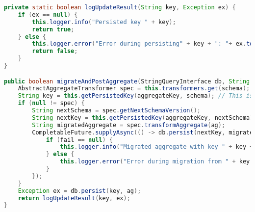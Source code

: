 \begin{lstlisting}[language=Java, caption={Metode for håndtering av POST-spørring i Migrator.}]
private static boolean logUpdateResult(String key, Exception ex) {
    if (ex == null) {
        this.logger.info("Persisted key " + key);
        return true;
    } else {
        this.logger.error("Error during persisting" + key + ": "+ ex.toString());
        return false;
    }
}

public boolean migrateAndPostAggregate(StringQueryInterface db, String aggregateKey, String schema, String ag) {
    AbstractAggregateTransformer spec = this.transformers.get(schema);
    String key = this.getPersistedKey(aggregateKey, schema); // This is the key used by the application
    if (null != spec) {
        String nextSchema = spec.getNextSchemaVersion();
        String nextKey = this.getPersistedKey(aggregateKey, nextSchema);
        String migratedAggregate = spec.transformAggregate(ag);
        CompletableFuture.supplyAsync(() -> db.persist(nextKey, migratedAggregate)).thenAcceptAsync((fail) -> {
            if (fail == null) {
                this.logger.info("Migrated aggregate with key " + key + " to " + nextKey);
            } else {
                this.logger.error("Error during migration from " + key + " to " + nextKey + ":\n"+ fail.toString());
            }
        });
    }
    Exception ex = db.persist(key, ag);
    return logUpdateResult(key, ex);
}
\end{lstlisting}
